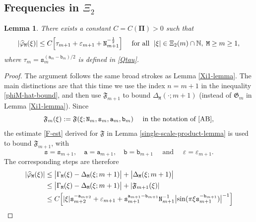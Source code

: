 \documentclass[12pt, twoside]{article}
\newtheorem{lemma}[theorem]{Lemma}
\theoremstyle{definition}
\numberwithin{equation}{section}
\begin{document}
\subsection{Frequencies in $\Xi_2$} 
\begin{lemma} \label{Xi2-lemma} 
There exists a constant $C = C(\pmb{\Pi}) > 0$ such that
\begin{equation} 
|\widehat{\varphi}_{\mathtt M}(\xi)| \leq C \Bigl[ \tau_{m+1} + \varepsilon_{m+1} + \mathtt N_{m+1}^{-\frac{1}{2}} \Bigr]  \quad  \text{ for all } \;  |\xi| \in \Xi_2(m) \cap \mathbb N, \; \mathtt M \geq m \geq 1,  \label{mu-hat-case-2}
\end{equation} 
where $\tau_m = \mathtt s_m^{(\mathtt a_m-\mathtt b_m)/2}$ is defined in \eqref{Qtau}. 
\end{lemma} 
\begin{proof} 
 The argument follows the same broad strokes as Lemma \ref{Xi1-lemma}. The main distinctions are that this time we use the index $n = m+1$ in  the inequality \eqref{phiM-hat-bound}, and then use $\mathfrak F_{m+1}$ to bound $\Delta_{\mathtt M}(\cdot; m+1)$ (instead of $\mathfrak G_m$ in Lemma \ref{Xi1-lemma}).  
Since \[ \mathfrak F_m(\xi) := \mathfrak F(\xi; \mathtt N_m, \mathtt s_m, \mathtt a_m, \mathtt b_m) \quad \text{ in the notation of \eqref{AB}}, \] 
the estimate \eqref{F-est} derived for $\mathfrak F$ in Lemma \ref{single-scale-product-lemma} is used to bound $\mathfrak F_{m+1}$, with 
\[\mathtt s = \mathtt s_{m+1}, \quad \mathtt a = \mathtt a_{m+1}, \quad \mathtt b = \mathtt b_{m+1} \quad \text{ and } \quad \varepsilon = \varepsilon_{m+1}. \] 
The corresponding steps are therefore 
\begin{align} 
|\widehat{\varphi}_{\mathtt M}(\xi)| 
&\leq   \bigl|\Gamma_{\mathtt M}(\xi) - \Delta_{\mathtt M}(\xi; m+1)\bigr| + \bigl|\Delta_{\mathtt M}(\xi; m+1) \bigr| \nonumber 
\\ &\leq  \bigl|\Gamma_{\mathtt M}(\xi) - \Delta_{\mathtt M}(\xi; m+1)\bigr| + |\mathfrak F_{m+1}(\xi)| \nonumber \\ 
&\leq  C \Bigl[ |\xi| \mathtt s_{m+2}^{-\mathtt a_{m+2}} + \varepsilon_{m+1} + {\mathtt s_{m+1}^{\mathtt a_{m+1} - \mathtt b_{m+1}}}{\mathtt N_{m+1}^{-1}} \bigl|\sin(\pi \xi \mathtt s_{m + 1}^{-\mathtt b_{m+1}}) \bigr|^{-1} \Bigr] \nonumber \\ 

\end{align}
\end{proof}
\end{document}
